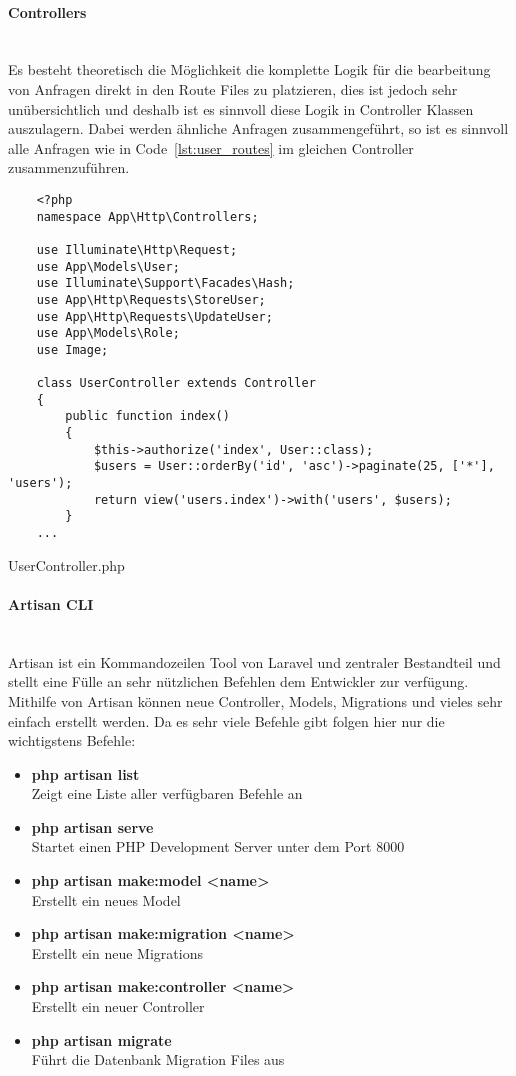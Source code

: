\paragraph{Controllers}\mbox{}\\
Es besteht theoretisch die Möglichkeit die komplette Logik für die bearbeitung
von Anfragen direkt in den Route Files zu platzieren, dies ist jedoch sehr
unübersichtlich und deshalb ist es sinnvoll diese Logik in Controller Klassen
auszulagern. Dabei werden ähnliche Anfragen zusammengeführt, so ist es sinnvoll
alle Anfragen wie in Code~\ref{lst:user_routes} im gleichen Controller
zusammenzuführen.

\begin{listing}[H]
  \begin{verbatim}
    <?php
    namespace App\Http\Controllers;

    use Illuminate\Http\Request;
    use App\Models\User;
    use Illuminate\Support\Facades\Hash;
    use App\Http\Requests\StoreUser;
    use App\Http\Requests\UpdateUser;
    use App\Models\Role;
    use Image;

    class UserController extends Controller
    {
        public function index()
        {
            $this->authorize('index', User::class);
            $users = User::orderBy('id', 'asc')->paginate(25, ['*'], 'users');
            return view('users.index')->with('users', $users);
        }
    ...
  \end{verbatim}
  \caption{UserController.php}
\end{listing}

\paragraph{Artisan CLI}\mbox{}\\
Artisan ist ein Kommandozeilen Tool von Laravel und zentraler Bestandteil und
stellt eine Fülle an sehr nützlichen Befehlen dem Entwickler zur verfügung.
Mithilfe von Artisan können neue Controller, Models, Migrations und vieles sehr
einfach erstellt werden. Da es sehr viele Befehle gibt folgen hier nur die
wichtigstens Befehle:

\begin{itemize}
  \item \textbf{php artisan list}\\
  Zeigt eine Liste aller verfügbaren Befehle an
  \item \textbf{php artisan serve}\\
  Startet einen PHP Development Server unter dem Port 8000
  \item \textbf{php artisan make:model <name>}\\
  Erstellt ein neues Model
  \item \textbf{php artisan make:migration <name>}\\
  Erstellt ein neue Migrations
  \item \textbf{php artisan make:controller <name>}\\
  Erstellt ein neuer Controller
  \item \textbf{php artisan migrate}\\
  Führt die Datenbank Migration Files aus
\end{itemize}

